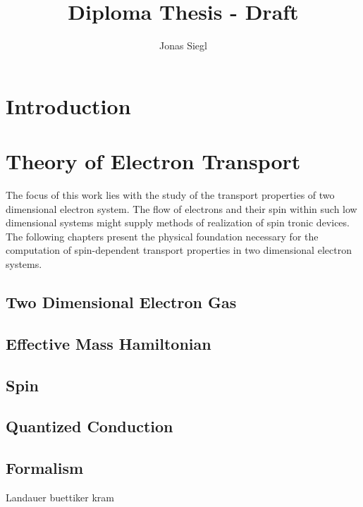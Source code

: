 
\author{Jonas Siegl}
\title{Diploma Thesis - Draft}




\maketitle
% 

\clearpage
\thispagestyle{empty}
\mbox{}
\clearpage
\thispagestyle{plain} %
\tableofcontents
\clearpage
\section{Introduction}
\clearpage
\section{Theory of Electron Transport}
The focus of this work lies with the study of the transport properties of two dimensional electron system. The flow of electrons and their spin within such low dimensional systems might supply methods of realization of spin tronic devices.
 The following chapters present the physical foundation necessary for the computation of spin-dependent transport properties in two dimensional electron systems.
  \subsection{Two Dimensional Electron Gas}
    
  \subsection{Effective Mass Hamiltonian}
    
  \subsection{Spin}
    
  \subsection{Quantized Conduction}
  \subsection{\gfnc{} Formalism}
  Landauer buettiker kram
